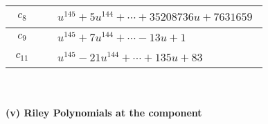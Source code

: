 \documentclass[1p]{elsarticle_modified}
\theoremstyle{definition}
\begin{document}
\begin{tabular}{m{50pt}|m{274pt}}
\hline $$\begin{aligned}c_{8}\end{aligned}$$&$\begin{aligned}
&u^{145}+5 u^{144}+\cdots+35208736 u+7631659
\end{aligned}$\\
\hline $$\begin{aligned}c_{9}\end{aligned}$$&$\begin{aligned}
&u^{145}+7 u^{144}+\cdots-13 u+1
\end{aligned}$\\
\hline $$\begin{aligned}c_{11}\end{aligned}$$&$\begin{aligned}
&u^{145}-21 u^{144}+\cdots+135 u+83
\end{aligned}$\\
\hline
\end{tabular}\\~\\
\newpage\renewcommand{\arraystretch}{1}
\flushleft \textbf{(v) Riley Polynomials at the component}\newline \\
\end{document}
